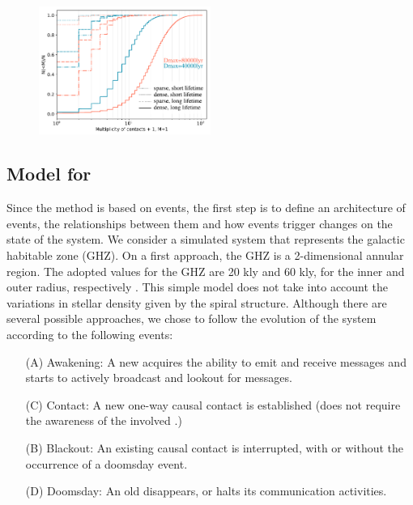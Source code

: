 

           
\begin{figure} \centering
   \includegraphics[width=0.5\textwidth]{F_number_of_contacts.pdf}
    \label{F_number_of_contacts}
\end{figure}
        

\subsection{Model for \cetis}

Since the method is based on events, the first step is to define an
architecture of events, the relationships between them and how events
trigger changes on the state of the system.
%
We consider a simulated system that represents the galactic habitable
zone (GHZ).
%
On a first approach, the GHZ is a 2-dimensional annular region.
%
The adopted values for the GHZ are 20 kly and 60 kly, for the inner
and outer radius, respectively \citep{lineweaver_galactic_2004}.
%
This simple model does not take into account the variations in stellar
density given by the spiral structure.
%
Although there are several possible approaches, we chose to follow the
evolution of the system according to the following events:

\begin{enumerate}
   \item[(A)] Awakening: A new \ceti acquires the ability to emit
      and receive messages and starts to actively broadcast and
      lookout for messages.
   \item[(C)] Contact: A new one-way causal contact is established
      (does not require the awareness of the involved \cetis.)
   \item[(B)] Blackout: An existing causal contact is interrupted,
      with or without the occurrence of a doomsday event.
   \item[(D)] Doomsday: An old \ceti disappears, or halts its
      communication activities.
\end{enumerate}

